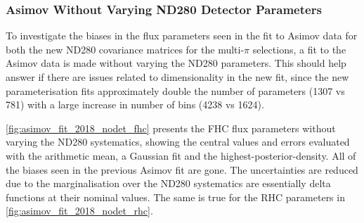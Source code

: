 \subsubsection{Asimov Without Varying ND280 Detector Parameters}
To investigate the biases in the flux parameters seen in the fit to Asimov data for both the new ND280 covariance matrices for the multi-$\pi$ selections, a fit to the Asimov data is made without varying the ND280 parameters. This should help answer if there are issues related to dimensionality in the new fit, since the new parameterisation fits approximately double the number of parameters (1307 vs 781) with a large increase in number of bins (4238 vs 1624).

\autoref{fig:asimov_fit_2018_nodet_fhc} presents the FHC flux parameters without varying the ND280 systematics, showing the central values and errors evaluated with the arithmetic mean, a Gaussian fit and the highest-posterior-density. All of the biases seen in the previous Asimov fit are gone. The uncertainties are reduced due to the marginalisation over the ND280 systematics are essentially delta functions at their nominal values. The same is true for the RHC parameters in \autoref{fig:asimov_fit_2018_nodet_rhc}.
